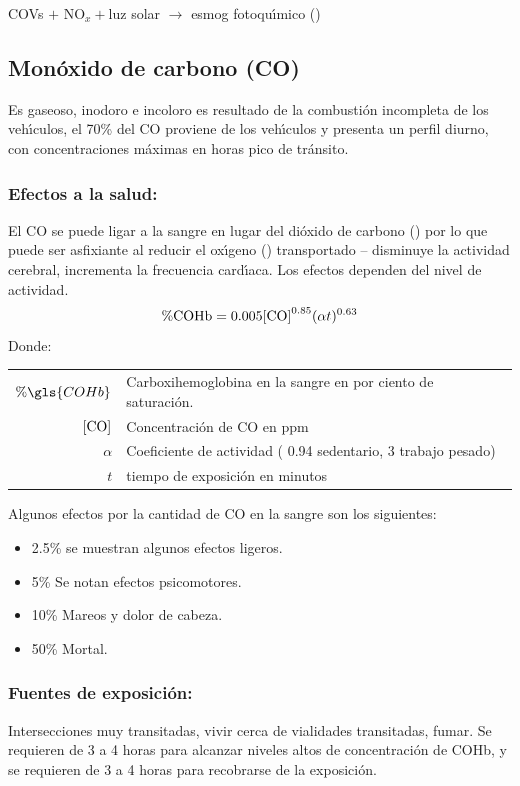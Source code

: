 \begin{center}
COVs $+$ NO$_x +$luz solar $\longrightarrow$ esmog fotoqu\'{\i}mico () 
\end{center}

\subsection{Mon\'oxido de carbono (CO)}
Es gaseoso, inodoro e incoloro es resultado de la combusti\'on incompleta de los veh\'{\i}culos, el 70\% del CO proviene de los veh\'{\i}culos y presenta un perfil diurno, con concentraciones m\'aximas en horas pico de tr\'ansito.

\subsubsection{Efectos a la salud:}
El CO se puede ligar a la sangre en lugar del di\'oxido de carbono () por lo que puede ser asfixiante al reducir el ox\'{\i}geno () transportado -- disminuye la actividad cerebral, incrementa la frecuencia card\'{\i}aca. Los efectos dependen del nivel de actividad.
\begin{equation}
\%\ce{COHb}  = 0.005[\ce{CO]}^{0.85}(\alpha t)^{0.63}
\end{equation}
Donde:

\begin{tabular}{r @{---}l}
$\%\gls{COHb} $ & Carboxihemoglobina en la sangre en por ciento de sa\-tu\-ra\-ci\'on.\\
$[\ce{CO}]$ &Concentraci\'on de CO en ppm\\
$\alpha$ & Coeficiente de actividad ( 0.94 sedentario, 3 trabajo pesado)\\
$t$ & tiempo de exposici\'on en minutos\\
\end{tabular}

Algunos efectos por la cantidad de CO en la sangre son los siguientes:
\begin{itemize}
\item 2.5\% se muestran algunos efectos ligeros.
\item 5\% Se notan efectos psicomotores.
\item 10\% Mareos y dolor de cabeza.
\item 50\% Mortal.
\end{itemize}

\subsubsection{Fuentes de exposici\'on:}
Intersecciones muy transitadas, vivir cerca de vialidades transitadas, fumar.
Se requieren de 3 a 4 horas para alcanzar niveles altos de concentraci\'on de COHb, y
se requieren de 3 a 4 horas para recobrarse de la exposici\'on.

